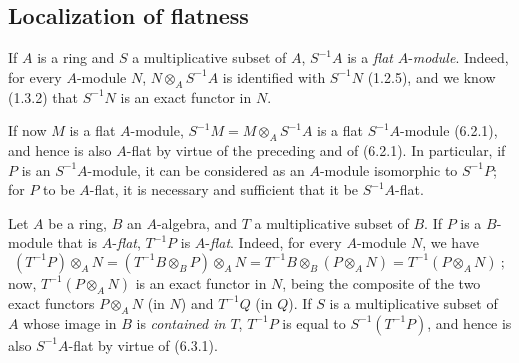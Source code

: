 \subsection{Localization of flatness}
\label{subsection:0.6.3}

\begin{env}[6.3.1]
\label{0.6.3.1}
If $A$ is a ring and $S$ a multiplicative subset of $A$, $S^{-1}A$ is
a \emph{flat} $A$-\emph{module}. Indeed, for every $A$-module $N$,
$N\otimes_A S^{-1}A$ is identified with $S^{-1}N$ (1.2.5), and we know (1.3.2)
that $S^{-1}N$ is an exact functor in $N$.

If now $M$ is a flat $A$-module,
$S^{-1}M=M\otimes_A S^{-1}A$ is a flat $S^{-1}A$-module (6.2.1), and hence
is also $A$-flat by virtue of the preceding and of (6.2.1). In particular,
if $P$ is an $S^{-1}A$-module, it can be considered as an $A$-module
isomorphic to $S^{-1}P$; for $P$ to be $A$-flat, it is necessary and sufficient
that it be $S^{-1}A$-flat.
\end{env}

\begin{env}[6.3.2]
\label{0.6.3.2}
Let $A$ be a ring, $B$ an $A$-algebra, and $T$ a multiplicative subset of
$B$. If $P$ is a $B$-module that is $A$-\emph{flat}, $T^{-1}P$ is $A$-\emph{flat}.
Indeed, for every $A$-module $N$, we have
\[
  (T^{-1}P)\otimes_A N
  =(T^{-1}B\otimes_B P)\otimes_A N
  =T^{-1}B\otimes_B(P\otimes_A N)
  =T^{-1}(P\otimes_A N)~;
\]
now, $T^{-1}(P\otimes_A N)$ is an exact functor in $N$, being the composite of the
two exact functors $P\otimes_A N$ (in $N$) and $T^{-1}Q$ (in $Q$). If $S$
is a multiplicative subset of $A$ whose image in $B$ is
\emph{contained in $T$}, $T^{-1}P$ is equal to $S^{-1}(T^{-1}P)$, and hence is
also $S^{-1}A$-flat by virtue of (6.3.1).
\end{env}


